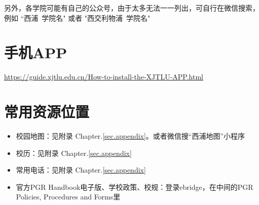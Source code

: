 另外，各学院可能有自己的公众号，由于太多无法一一列出，可自行在微信搜索，例如 “西浦\ {学院名}" 或者 "西交利物浦\ {学院名}"

\section{手机APP}
\url{https://guide.xjtlu.edu.cn/How-to-install-the-XJTLU-APP.html}

\section{常用资源位置}
\begin{itemize}
    \item 校园地图：见附录 Chapter.\ref{sec.appendix}。或者微信搜“西浦地图”小程序
    \item 校历：见附录 Chapter.\ref{sec.appendix}
    \item 常用电话：见附录 Chapter.\ref{sec.appendix}
    \item 官方PGR Handbook电子版、学校政策、校规：登录ebridge，在中间的PGR Policies, Procedures and Forms里
\end{itemize}

